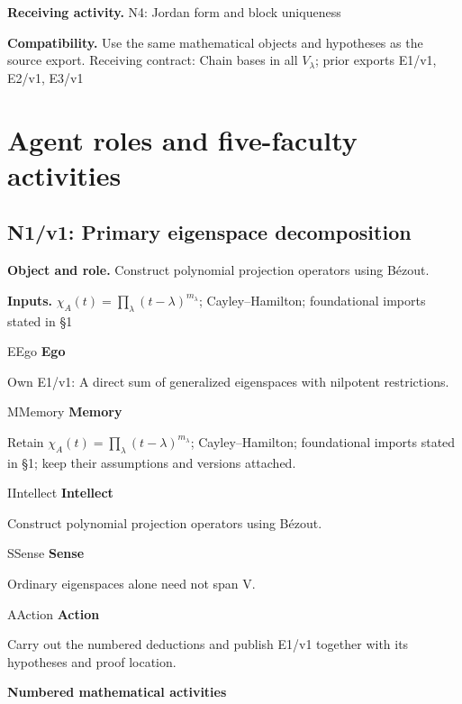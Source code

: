 \documentclass[preprint,12pt,aps,pra,showkeys,amsmath,amssymb,superscriptaddress,floatfix]{revtex4-2}
\theoremstyle{definition}
\theoremstyle{remark}
\newcommand{\mmfaculty}[3]{%
 \begin{mmfacultybox}{#1}{#2}
 {\sffamily\bfseries\color{MMBlue}#2}\par\smallskip #3
 \end{mmfacultybox}}
\newcommand{\field}[2]{\par\smallskip\noindent\textbf{#1.} #2\par}
\begin{document}
\field{Receiving activity}{N4: Jordan form and block uniqueness}

\field{Compatibility}{Use the same mathematical objects and hypotheses as the source export.
Receiving contract: Chain bases in all \(V_\lambda\); prior exports
E1/v1, E2/v1, E3/v1}

\endgroup

\clearpage\section{Agent roles and five-faculty activities}\begingroup\small\linespread{1.05}\selectfont{}

\subsection{N1/v1: Primary eigenspace decomposition}

\field{Object and role}{Construct polynomial projection operators using Bézout.}

\field{Inputs}{\(\chi _A(t)=\prod _\lambda (t-\lambda )^{m_\lambda }\);
Cayley--Hamilton; foundational imports stated in §1}

\mmfaculty{E}{Ego}{Own E1/v1: A direct sum of generalized eigenspaces with nilpotent
restrictions.}

\mmfaculty{M}{Memory}{Retain \(\chi _A(t)=\prod _\lambda (t-\lambda )^{m_\lambda }\);
Cayley--Hamilton; foundational imports stated in §1; keep their
assumptions and versions attached.}

\mmfaculty{I}{Intellect}{Construct polynomial projection operators using Bézout.}

\mmfaculty{S}{Sense}{Ordinary eigenspaces alone need not span V.}

\mmfaculty{A}{Action}{Carry out the numbered deductions and publish E1/v1 together with its
hypotheses and proof location.}

\smallskip\noindent\textbf{Numbered mathematical activities}
\end{document}
